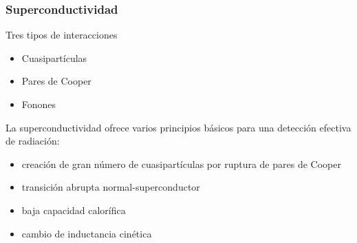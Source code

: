 \documentclass{beamer}
\begin{document}
\begin{frame}
				\frametitle{Superconductividad}
				\begin{alertblock}{Tres tipos de interacciones}
								\begin{itemize}
												\item Cuasipartículas
												\item Pares de Cooper
												\item Fonones
								\end{itemize}
				\end{alertblock}
				\begin{alertblock}{La superconductividad ofrece varios principios
								básicos para una detección efectiva de radiación:}
								\begin{itemize}
												\item creación de gran número de cuasipartículas por
																ruptura de {\color[rgb]{0.0,.5,.0}pares de Cooper}
												\item transición abrupta normal-superconductor 
												\item baja capacidad calorífica
												\item cambio de inductancia cinética
								\end{itemize}
				\end{alertblock}
\end{frame}
\end{document}
